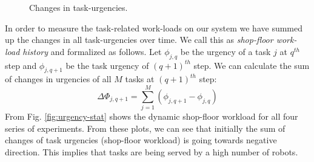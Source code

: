 \documentclass[final,5p,times,twocolumn]{elsarticle}
\begin{document}
\begin{figure}
\newline
{}
\newline
{}
\newline
\caption{Changes in task-urgencies.}
\end{figure}
In order to measure the task-related work-loads on our system we have summed up the changes in all task-urgencies over time. We call this as {\em shop-floor work-load history} and formalized as follows. Let $ \phi_{j, q}$ be the urgency of a task $j$ at $q^{th}$ step and $\phi_{j, q+1}$ be the task urgency of $(q+1)^{th}$ step. We can calculate the sum of changes in urgencies of all $M$ tasks at $(q+1)^{th}$ step:
\begin{equation} 
\Delta \Phi_{j, q+1} = \sum_{j=1}^{M} (\phi_{j, q+1} - \phi_{j, q})
\label{eqn:Delta-Phi}
\end{equation}
From Fig. \ref{fig:urgency-stat} shows the dynamic shop-floor workload for all four series of experiments. From these plots, we can see that initially the sum of changes of task urgencies (shop-floor workload) is going towards negative direction. This implies that tasks are being served by a high number of robots. 
\end{document}
